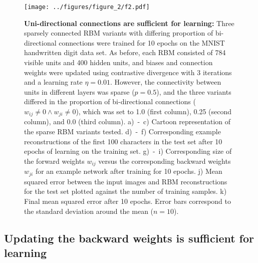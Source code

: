 \documentclass[11pt]{article}
\begin{document}
\begin{figure}[H]
  \label{fig:unidirectional_connections}
  \centering
  \texttt{[image: ../figures/figure\_2/f2.pdf]}
  \caption{\footnotesize
    \textbf{Uni-directional connections are sufficient for learning:}
    Three sparsely connected RBM variants with differing proportion of bi-directional connections were trained for 10 epochs on the MNIST handwritten digit data set.
    As before, each RBM consisted of 784 visible units and 400 hidden units,
    and biases and connection weights were updated using contrastive divergence with 3 iterations and a learning rate $\eta=0.01$.
    However, the connectivity between units in different layers was sparse ($p=0.5$),
    and the three variants differed in the proportion of
    bi-directional connections ($w_{ij} \neq 0 \land w_{ji} \neq 0$),
    which was set to 1.0 (first column), 0.25 (second column), and 0.0
    (third column).
    a)~-~c) Cartoon representation of the sparse RBM variants tested.
    d)~-~f) Corresponding example reconstructions of the first 100 characters in the test set after 10 epochs of learning on the training set.
    g)~-~i) Corresponding size of the forward weights $w_{ij}$ versus the corresponding backward weights $w_{ji}$ for an example network after training for 10 epochs.
    j) Mean squared error between the input images and RBM reconstructions for the test set plotted against the number of training samples.
    k) Final mean squared error after 10 epochs. Error bars correspond to the standard deviation around the mean ($n = 10$).
  }
\end{figure}

\subsection{Updating the backward weights is sufficient for learning}
\end{document}
